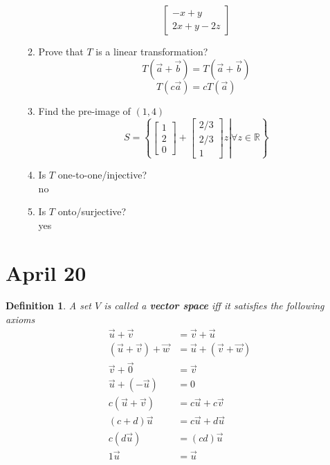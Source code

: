 \documentclass[11pt]{article}
\newtheorem{defn}{Definition}
\begin{document}
\begin{enumerate}
\begin{enumerate}
                \[\begin{bmatrix} -x+y \\ 2x+y-2z \end{bmatrix}\]
          \item Prove that $T$ is a linear transformation?\\
                \[T(\vec{a} + \vec{b}) = T(\vec{a} + \vec{b})\]
                \[T(c\vec{a}) = cT(\vec{a})\]
          \item Find the pre-image of $(1, 4)$ \\
                \[S = \left\{\left. \begin{bmatrix} 1 \\ 2 \\ 0 \end{bmatrix}  + \begin{bmatrix} 2/3 \\ 2/3 \\ 1 \end{bmatrix} z \right | \forall z \in \mathbb{R}\right\}\]
          \item Is $T$ one-to-one/injective?\\
                no\\
          \item Is $T$ onto/surjective? \\
          yes
        \end{enumerate}

\end{enumerate}

\section{April 20}
\begin{defn}
  A set $V$ is called a \textbf{vector space} iff it satisfies the following axioms
  \begin{align*}
    \vec{u} + \vec{v} &= \vec{v} + \vec{u} \\
    (\vec{u} + \vec{v}) + \vec{w} &= \vec{u} + (\vec{v} + \vec{w})\\
    \vec{v} + \vec{0} &= \vec{v} \\
    \vec{u} + (-\vec{u}) &=0 \\
    c(\vec{u} + \vec{v}) &= c\vec{u} + c\vec{v} \\
    (c+d)\vec{u} &= c\vec{u}+d\vec{u}\\
    c(d\vec{u}) &= (cd)\vec{u} \\
    1\vec{u} &= \vec{u}
  \end{align*}
\end{defn}
\end{document}
